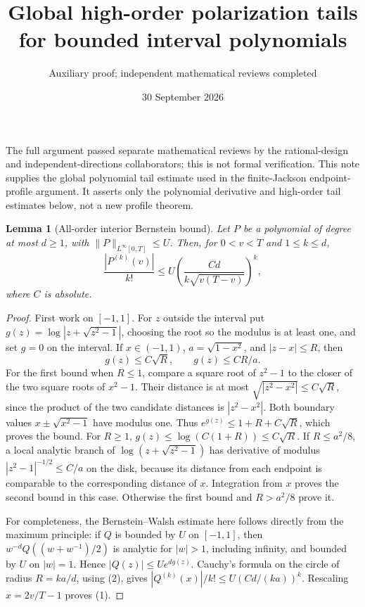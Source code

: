 \documentclass[11pt]{article}
\title{Global high-order polarization tails for bounded interval polynomials}
\author{Auxiliary proof; independent mathematical reviews completed}
\date{30 September 2026}
\newtheorem{lemma}{Lemma}\newtheorem{theorem}{Theorem}
\begin{document}
\maketitle
The full argument passed separate mathematical reviews by the rational-design
and independent-directions collaborators; this is not formal verification.
This note supplies the global polynomial tail estimate used in the
finite-Jackson endpoint-profile argument. It asserts only the polynomial
derivative and high-order tail estimates below, not a new profile theorem.

\begin{lemma}[All-order interior Bernstein bound]\label{bernstein}
Let $P$ be a polynomial of degree at most $d\ge1$, with
$\|P\|_{L^\infty[0,T]}\le U$. Then, for $0<v<T$ and $1\le k\le d$,
\[
 \frac{|P^{(k)}(v)|}{k!}
 \le U\left(\frac{Cd}{k\sqrt{v(T-v)}}\right)^k,           \tag{1}
\]
where $C$ is absolute.
\end{lemma}
\begin{proof}
First work on $[-1,1]$. For $z$ outside the interval put
$g(z)=\log|z+\sqrt{z^2-1}|$, choosing the root so the modulus is
at least one, and set $g=0$ on the interval. If $x\in(-1,1)$,
$a=\sqrt{1-x^2}$, and $|z-x|\le R$, then
\[
 g(z)\le C\sqrt R,\qquad g(z)\le CR/a.                  \tag{2}
\]
For the first bound when $R\le1$, compare a square root of $z^2-1$
to the closer of the two square roots of $x^2-1$. Their distance is
at most $\sqrt{|z^2-x^2|}\le C\sqrt R$, since the product of the
two candidate distances is $|z^2-x^2|$.
Both boundary values $x\pm\sqrt{x^2-1}$ have modulus one. Thus
$e^{g(z)}\le1+R+C\sqrt R$, which proves the bound. For $R\ge1$,
$g(z)\le\log(C(1+R))\le C\sqrt R$.
If $R\le a^2/8$, a local analytic branch of
$\log(z+\sqrt{z^2-1})$ has derivative of modulus
$|z^2-1|^{-1/2}\le C/a$ on the disk, because its distance from each
endpoint is comparable to the corresponding distance of $x$.
Integration from $x$ proves the second bound in this case. Otherwise
the first bound and $R>a^2/8$ prove it.

For completeness, the Bernstein--Walsh estimate here follows directly
from the maximum principle: if $Q$ is bounded by $U$ on $[-1,1]$,
then $w^{-d}Q((w+w^{-1})/2)$ is analytic for $|w|>1$, including
infinity, and bounded by $U$ on $|w|=1$. Hence
$|Q(z)|\le U e^{d g(z)}$.
Cauchy's formula on the circle of radius $R=ka/d$, using (2), gives
$|Q^{(k)}(x)|/k!\le U(Cd/(ka))^k$.
Rescaling $x=2v/T-1$ proves (1).
\end{proof}
\end{document}
